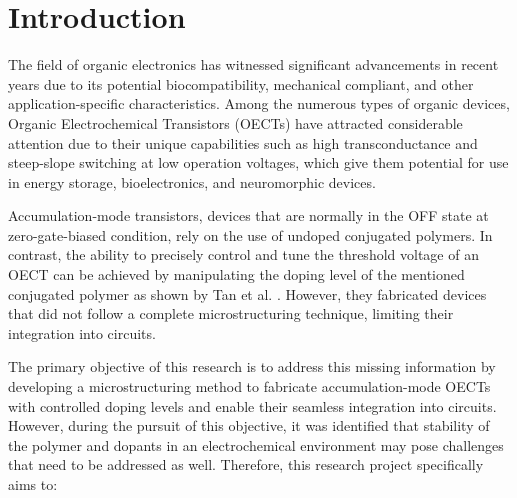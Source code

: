 \chapter{Introduction}
\label{cha:intro}

The field of organic electronics has witnessed significant advancements in recent years due to its potential biocompatibility, mechanical compliant, and other application-specific characteristics. Among the numerous types of organic devices, Organic Electrochemical Transistors (OECTs) have attracted considerable attention due to their unique capabilities such as high transconductance and steep-slope switching at low operation voltages, which give them potential for use in energy storage, bioelectronics, and neuromorphic devices. 

Accumulation-mode transistors, devices that are normally in the OFF state at zero-gate-biased condition, rely on the use of undoped conjugated polymers. In contrast, the ability to precisely control and tune the threshold voltage of an OECT can be achieved by manipulating the doping level of the mentioned conjugated polymer as shown by Tan et al. \cite{tanTuningOrganicElectrochemical2022}.  However, they fabricated devices that did not follow a complete microstructuring technique, limiting their integration into circuits. 



The primary objective of this research is to address this missing information by developing a microstructuring method to fabricate accumulation-mode OECTs with controlled doping levels and enable their seamless integration into circuits. However, during the pursuit of this objective, it was identified that stability of the polymer and dopants in an electrochemical environment may pose challenges that need to be addressed as well. Therefore, this research project specifically aims to:


